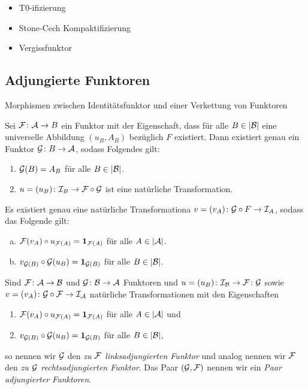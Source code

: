\begin{ex}
  \begin{itemize}
    \item T0-ifizierung
    \item Stone-Cech Kompaktifizierung
    \item Vergissfunktor
  \end{itemize}
\end{ex}

\begin{defn}
  
\end{defn}

\subsection{Adjungierte Funktoren}

Morphismen zwischen Identitätsfunktor und einer Verkettung von Funktoren

\begin{thm}
  Sei $\mathcal{F} \colon \mathcal{A} \to B$ ein Funktor mit der Eigenschaft, dass für alle $B \in |\mathcal{B}|$ eine universelle Abbildung $(u_B, A_B)$ bezüglich $F$ existiert.
  Dann existiert genau ein Funktor $\mathcal{G} \colon B \to \mathcal{A}$, sodass Folgendes gilt:
  \begin{enumerate}[(1)]
    \item $\mathcal{G}(B) = A_B$ für alle $B \in |\mathcal{B}|$.
    \item $u = (u_B) \colon \mathcal{I}_B \to \mathcal{F} \circ \mathcal{G}$ ist eine natürliche Transformation.
  \end{enumerate}
\end{thm}

\begin{kor}
  Es existiert genau eine natürliche Transformationa $v = (v_A) \colon \mathcal{G} \circ F \to \mathcal{I}_A$, sodass das Folgende gilt:
  \begin{enumerate}[(a)]
    \item $\mathcal{F}(v_A) \circ u_{\mathcal{F}(A)} = \mathbf{1}_{\mathcal{F}(A)}$ für alle $A \in |\mathcal{A}|$.
    \item $v_{\mathcal{G}(B)} \circ \mathcal{G}(u_B) = \mathbf{1}_{\mathcal{G}(B)}$ für alle $B \in |\mathcal{B}|$.
  \end{enumerate}
\end{kor}

\begin{defn}
  Sind $\mathcal{F} \colon \mathcal{A} \to \mathcal{B}$ und $\mathcal{G} \colon \mathcal{B} \to \mathcal{A}$ Funktoren und $u = (u_B) \colon \mathcal{I}_{\mathcal{B}} \to \mathcal{F} \colon \mathcal{G}$ sowie $v = (v_A) \colon \mathcal{G} \circ \mathcal{F} \to \mathcal{I}_{\mathcal{A}}$ natürliche Transformationen mit den Eigenschaften
  \begin{enumerate}[(1)]
    \item $\mathcal{F}(v_A) \circ u_{\mathcal{F}(A)} = \mathbf{1}_{\mathcal{F}(A)}$ für alle $A \in |\mathcal{A}|$ und
    \item $v_{\mathcal{G}(B)} \circ \mathcal{G}(u_B) = \mathbf{1}_{\mathcal{G}(B)}$ für alle $B \in |\mathcal{B}|$,
  \end{enumerate}
  so nennen wir $\mathcal{G}$ den \emph{zu $\mathcal{F}$ linksadjungierten Funktor} und analog nennen wir $\mathcal{F}$ den \emph{zu $\mathcal{G}$ rechtsadjungierten Funktor}.
  Das Paar $(\mathcal{G}, \mathcal{F})$ nennen wir ein \emph{Paar adjungierter Funktoren}.
\end{defn}

